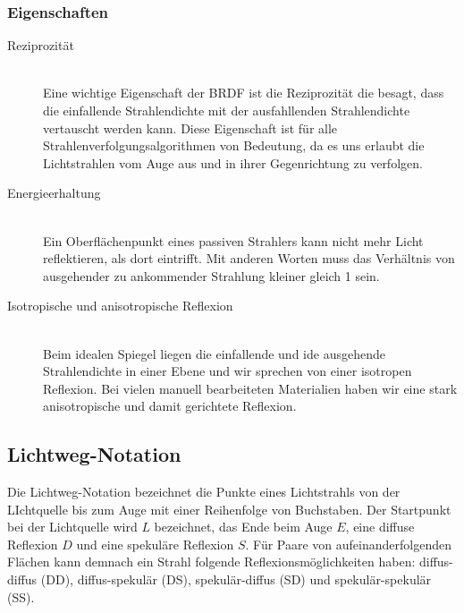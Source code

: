\documentclass[10pt]{article}
\begin{document}
\subsubsection{Eigenschaften}
\begin{description}
	\item[Reziprozität] \hfill \\
		Eine wichtige Eigenschaft der BRDF ist die Reziprozität die besagt, dass die einfallende Strahlendichte mit der ausfahllenden Strahlendichte vertauscht werden kann. Diese Eigenschaft ist für alle Strahlenverfolgungsalgorithmen von Bedeutung, da es uns erlaubt die Lichtstrahlen vom Auge aus und in ihrer Gegenrichtung zu verfolgen.
	\item[Energieerhaltung] \hfill \\
		Ein Oberflächenpunkt eines passiven Strahlers kann nicht mehr Licht reflektieren, als dort eintrifft. Mit anderen Worten muss das Verhältnis von ausgehender zu ankommender Strahlung kleiner gleich 1 sein.
	\item[Isotropische und anisotropische Reflexion] \hfill \\
		Beim idealen Spiegel liegen die einfallende und ide ausgehende Strahlendichte in einer Ebene und wir sprechen von einer isotropen Reflexion.  Bei vielen manuell bearbeiteten Materialien haben wir eine stark anisotropische und damit gerichtete Reflexion.
\end{description}

\subsection{Lichtweg-Notation}
Die Lichtweg-Notation bezeichnet die Punkte eines Lichtstrahls von der LIchtquelle bis zum Auge mit einer Reihenfolge von Buchstaben. Der Startpunkt bei der Lichtquelle wird $L$ bezeichnet, das Ende beim Auge $E$, eine diffuse Reflexion $D$ und eine spekuläre Reflexion $S$. Für Paare von aufeinanderfolgenden Flächen kann demnach ein Strahl folgende Reflexionsmöglichkeiten haben: diffus-diffus (DD), diffus-spekulär (DS), spekulär-diffus (SD) und spekulär-spekulär (SS).
\end{document}
